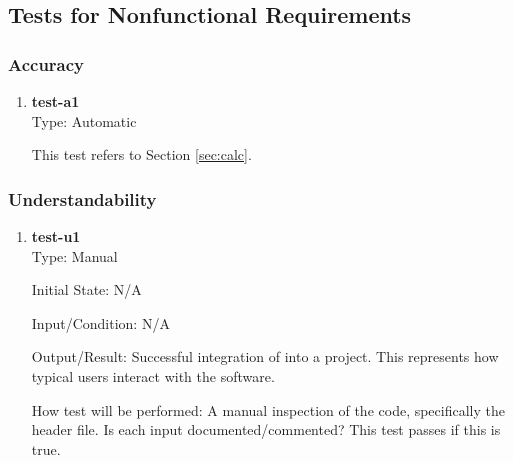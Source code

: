 \documentclass[12pt, titlepage]{article}
\newcommand{\Tthetestnum}{T\thetestnum}
\begin{document}
\subsection{Tests for Nonfunctional Requirements}




\subsubsection{Accuracy}


\begin{enumerate}

\item[\refstepcounter{testnum} \Tthetestnum \label{t:a1}:] \textbf{test-a1} \\

    Type: Automatic

    This test refers to Section \ref{sec:calc}.
\end{enumerate}

\subsubsection{Understandability}

\begin{enumerate}

\item[\refstepcounter{testnum} \Tthetestnum \label{t:u1}:] \textbf{test-u1} \\

    Type: Manual

    Initial State: N/A

    Input/Condition: N/A

    Output/Result: Successful integration of \progname{} into a project. This represents how typical
    users interact with the software.

    How test will be performed: A manual inspection of the code, specifically the header file. Is
    each input documented/commented? This test passes if this is true.
\end{enumerate}
\end{document}

